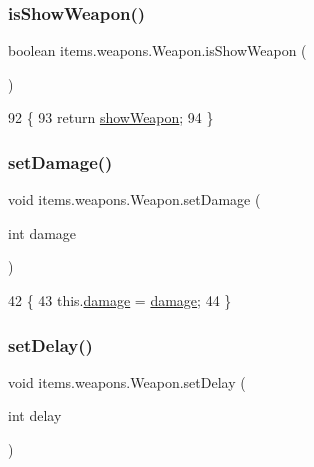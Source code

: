 \subsubsection{\texorpdfstring{is\+Show\+Weapon()}{isShowWeapon()}}
{\footnotesize\ttfamily boolean items.\+weapons.\+Weapon.\+is\+Show\+Weapon (\begin{DoxyParamCaption}{ }\end{DoxyParamCaption})\hspace{0.3cm}{\ttfamily [inline]}}


\begin{DoxyCode}
92                                   \{
93         \textcolor{keywordflow}{return} \mbox{\hyperlink{classitems_1_1weapons_1_1_weapon_a10d11b88c4ef35bf42543658c6d7e675}{showWeapon}};
94     \}
\end{DoxyCode}
\mbox{\label{classitems_1_1weapons_1_1_weapon_acf41ab9ef5553f5cb088c97239b67246}} 
\subsubsection{\texorpdfstring{set\+Damage()}{setDamage()}}
{\footnotesize\ttfamily void items.\+weapons.\+Weapon.\+set\+Damage (\begin{DoxyParamCaption}\item[{int}]{damage }\end{DoxyParamCaption})\hspace{0.3cm}{\ttfamily [inline]}}


\begin{DoxyCode}
42                                       \{
43         this.\mbox{\hyperlink{classitems_1_1weapons_1_1_weapon_aa84d0aca66daedb3adb9209b6f2846a3}{damage}} = \mbox{\hyperlink{classitems_1_1weapons_1_1_weapon_aa84d0aca66daedb3adb9209b6f2846a3}{damage}};
44     \}
\end{DoxyCode}
\mbox{\label{classitems_1_1weapons_1_1_weapon_a98719da299135bbd2a0ea2db0afef911}} 
\subsubsection{\texorpdfstring{set\+Delay()}{setDelay()}}
{\footnotesize\ttfamily void items.\+weapons.\+Weapon.\+set\+Delay (\begin{DoxyParamCaption}\item[{int}]{delay }\end{DoxyParamCaption})\hspace{0.3cm}{\ttfamily [inline]}}


